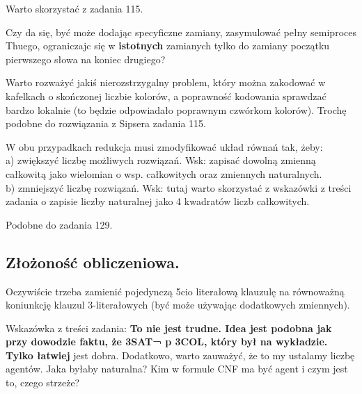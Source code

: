 \documentclass[a4paper,11pt]{article}
\newenvironment{zadanie}[1]
  {\renewcommand\theinnercustomthm{#1}\innercustomthm}
  {\endinnercustomthm}
\begin{document}
\begin{zadanie}{116}
Warto skorzystać z zadania 115.
\end{zadanie}

\begin{zadanie}{118}
Czy da się, być może dodając specyficzne zamiany, zasymulować pełny semiproces Thuego, ograniczajc się w \textbf{istotnych} 
zamianych tylko do zamiany początku pierwszego słowa na koniec drugiego?
\end{zadanie}

\begin{zadanie}{120}
 Warto rozważyć jakiś nierozstrzygalny problem, który można zakodować w kafelkach o skończonej liczbie kolorów, a poprawność
 kodowania sprawdzać bardzo lokalnie (to będzie odpowiadało poprawnym czwórkom kolorów). Trochę podobne do rozwiązania 
 z Sipsera zadania 115.
\end{zadanie}

\begin{zadanie}{121}
 W obu przypadkach redukcja musi zmodyfikować układ równań tak, żeby:\\
 a) zwiększyć liczbę możliwych rozwiązań. Wsk: zapisać dowolną zmienną całkowitą jako wielomian o wsp. całkowitych oraz 
 zmiennych naturalnych. \\
 b) zmniejszyć liczbę rozwiązań. Wsk: tutaj warto skorzystać z wskazówki z treści zadania o zapisie liczby naturalnej 
 jako 4 kwadratów liczb całkowitych.
\end{zadanie}

\begin{zadanie}{122}
 Podobne do zadania 129.
\end{zadanie}

\subsection{Złożoność obliczeniowa.}

\begin{zadanie}{143}
Oczywiście trzeba zamienić pojedynczą 5cio literałową klauzulę na równoważną koniunkcję klauzul 3-literałowych 
(być może używając dodatkowych zmiennych).
\end{zadanie}

\begin{zadanie}{144}
Wskazówka z treści zadania: \textbf{To nie jest trudne. Idea jest podobna jak przy dowodzie faktu, że 3SAT¬ p 3COL, który był na wykładzie. Tylko łatwiej} jest dobra. Dodatkowo, warto zauważyć, że to my ustalamy liczbę agentów. Jaka byłaby 
naturalna? Kim w formule CNF ma być agent i czym jest to, czego strzeże?
\end{zadanie}
\end{document}
